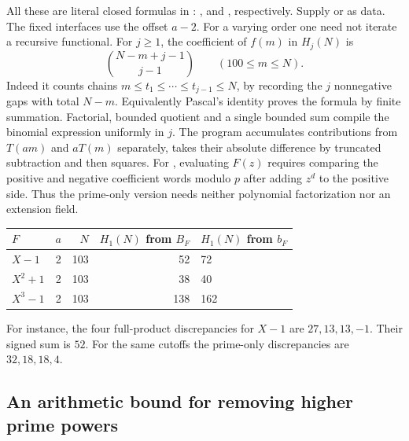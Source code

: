All these are literal closed formulas in : ,  and , respectively. Supply  or  as data. The fixed interfaces use the offset $a-2$. For a varying order one need not iterate a recursive functional. For $j\ge1$, the coefficient of $f(m)$ in $H_j(N)$ is
\[
                   \binom{N-m+j-1}{j-1}\qquad(100\le m\le N).
\]
Indeed it counts chains $m\le t_1\le\cdots\le t_{j-1}\le N$, by recording the $j$ nonnegative gaps with total $N-m$. Equivalently Pascal's identity proves the formula by finite summation. Factorial, bounded quotient and a single bounded sum compile the binomial expression uniformly in $j$. The program accumulates contributions from $T(am)$ and $aT(m)$ separately, takes their absolute difference by truncated subtraction and then squares. For , evaluating $F(z)$ requires comparing the positive and negative coefficient words modulo $p$ after adding $z^d$ to the positive side. Thus the prime-only version needs neither polynomial factorization nor an extension field.

\begin{center}\small
\begin{tabular}{@{}lrrrl@{}}\toprule
$F$ & $a$ & $N$ & $H_1(N)$ from $B_F$ & $H_1(N)$ from $b_F$\\\midrule
$X-1$ &2&103&52&72\\
$X^2+1$ &2&103&38&40\\
$X^3-1$ &2&103&138&162\\\bottomrule
\end{tabular}
\end{center}
For instance, the four full-product discrepancies for $X-1$ are $27,13,13,-1$. Their signed sum is $52$. For the same cutoffs the prime-only discrepancies are $32,18,18,4$.

\subsection*{An arithmetic bound for removing higher prime powers}

